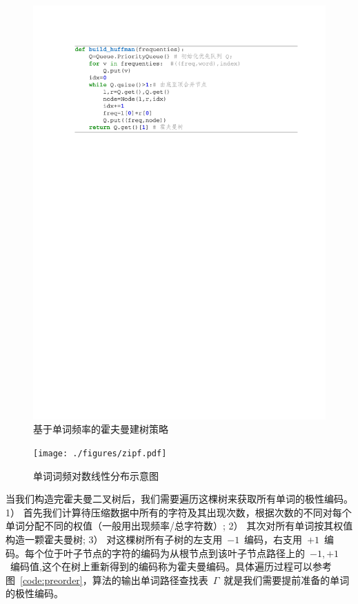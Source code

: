 \begin{figure}[!ht]
  \centering
\includegraphics[width=1\linewidth]{./figures/huffman.pdf}
\caption{基于单词频率的霍夫曼建树策略}\label{code:huffman}
\end{figure}

\begin{figure}[!ht]
  \centering
\texttt{[image: ./figures/zipf.pdf]}
\caption{单词词频对数线性分布示意图}\label{fig:zipf}
\end{figure}

当我们构造完霍夫曼二叉树后，我们需要遍历这棵树来获取所有单词的极性编码。1） 首先我们计算待压缩数据中所有的字符及其出现次数，根据次数的不同对每个单词分配不同的权值（一般用出现频率/总字符数）; 2） 其次对所有单词按其权值构造一颗霍夫曼树; 3） 对这棵树所有子树的左支用~$-1$~编码，右支用~$+1$~编码。每个位于叶子节点的字符的编码为从根节点到该叶子节点路径上的~$-1,+1$~编码值,这个在树上重新得到的编码称为霍夫曼编码。具体遍历过程可以参考图~\ref{code:preorder}，算法的输出单词路径查找表~$\Gamma$~就是我们需要提前准备的单词的极性编码。



